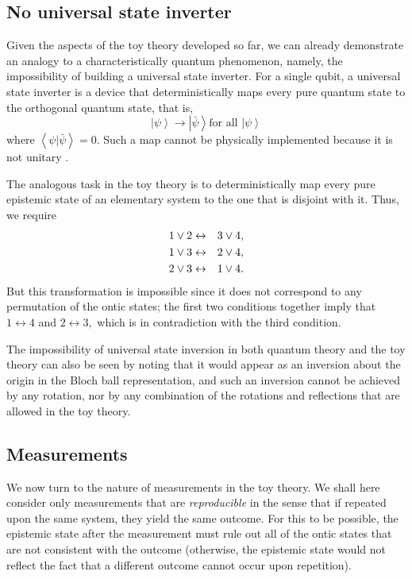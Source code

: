 \documentclass[pra,nofootinbib,showpacs,12pt]{revtex4}
\begin{document}
\subsection{No universal state inverter}

\label{nostateinverter}

Given the aspects of the toy theory developed so far, we can already
demonstrate an analogy to a characteristically quantum phenomenon, namely,
the impossibility of building a universal state inverter. For a single
qubit, a universal state inverter is a device that deterministically maps
every pure quantum state to the orthogonal quantum state, that is,
\begin{equation}
\left| \psi \right\rangle \rightarrow \left| \bar{\psi}\right\rangle \text{
for all }\left| \psi \right\rangle
\end{equation}
where $\left\langle \psi |\bar{\psi}\right\rangle =0.$ Such a map cannot be
physically implemented because it is not unitary \cite{nostateinverter}.

The analogous task in the toy theory is to deterministically map every pure
epistemic state of an elementary system to the one that is disjoint with it.
Thus, we require
\begin{eqnarray}
1\vee 2 &\leftrightarrow &3\vee 4,  \notag \\
1\vee 3 &\leftrightarrow &2\vee 4,  \notag \\
2\vee 3 &\leftrightarrow &1\vee 4.
\end{eqnarray}
But this transformation is impossible since it does not correspond to any
permutation of the ontic states; the first two conditions together imply
that $1\leftrightarrow 4$ and $2\leftrightarrow 3,$ which is in
contradiction with the third condition.

The impossibility of universal state inversion in both quantum theory and
the toy theory can also be seen by noting that it would appear as an
inversion about the origin in the Bloch ball representation, and such an
inversion cannot be achieved by any rotation, nor by any combination of the
rotations and reflections that are allowed in the toy theory.

\subsection{Measurements}

\label{measurements1}

\strut We now turn to the nature of measurements in the toy theory. We shall
here consider only measurements that are \emph{reproducible} in the sense
that if repeated upon the same system, they yield the same outcome. For this
to be possible, the epistemic state after the measurement must rule out all
of the ontic states that are not consistent with the outcome (otherwise, the
epistemic state would not reflect the fact that a different outcome cannot
occur upon repetition).
\end{document}
